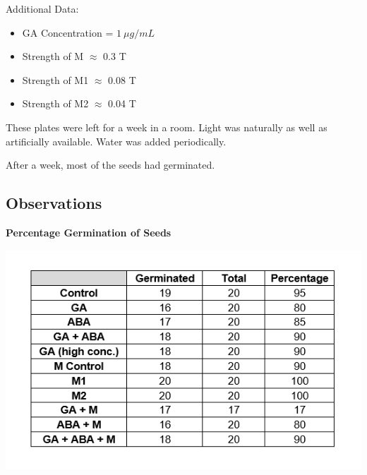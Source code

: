 \documentclass[twocolumn]{article}
\begin{document}
Additional Data:
\begin{itemize}
    \item GA Concentration = $1\ \mu g / mL$
    \item Strength of M $\approx$ 0.3 T
    \item Strength of M1 $\approx$ 0.08 T
    \item Strength of M2 $\approx$ 0.04 T
\end{itemize}

These plates were left for a week in a room. Light was naturally as well as artificially available. Water was added periodically. 

After a week, most of the seeds had germinated. 

\subsection{Observations}

\textbf{Percentage Germination of Seeds}

\includegraphics[width = \linewidth]{Number of Seeds Germinated.png}
\end{document}
